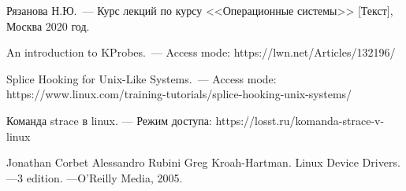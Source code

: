 
\begin{thebibliography}{9} 
    
    Рязанова Н.Ю.~--- Курс лекций по курсу <<Операционные системы>> [Текст], Москва 2020 год.
    \addtocounter{bibqty}{1}

    An introduction to KProbes.~--- Access mode: https://lwn.net/Articles/132196/
    \addtocounter{bibqty}{1}

    Splice Hooking for Unix-Like Systems.~--- Access mode: https://www.linux.com/training-tutorials/splice-hooking-unix-systems/
    \addtocounter{bibqty}{1}
    
    Команда strace в linux. — Режим доступа: https://losst.ru/komanda-strace-v-linux
    \addtocounter{bibqty}{1}

    Jonathan Corbet Alessandro Rubini Greg Kroah-Hartman. Linux Device Drivers. ––3 edition. ––O’Reilly Media, 2005.
    \addtocounter{bibqty}{1}

\end{thebibliography}
